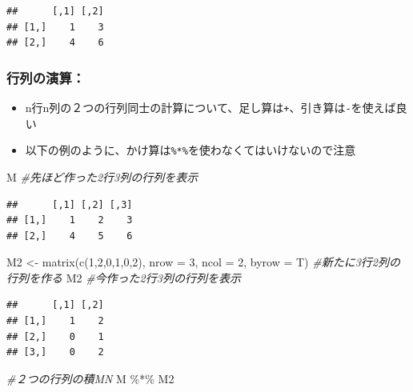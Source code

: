 \documentclass[
]{book}
\newenvironment{Shaded}{\begin{snugshade}}{\end{snugshade}}
\newcommand{\AttributeTok}[1]{\textcolor[rgb]{0.77,0.63,0.00}{#1}}
\newcommand{\CommentTok}[1]{\textcolor[rgb]{0.56,0.35,0.01}{\textit{#1}}}
\newcommand{\DecValTok}[1]{\textcolor[rgb]{0.00,0.00,0.81}{#1}}
\newcommand{\FunctionTok}[1]{\textcolor[rgb]{0.00,0.00,0.00}{#1}}
\newcommand{\NormalTok}[1]{#1}
\newcommand{\OtherTok}[1]{\textcolor[rgb]{0.56,0.35,0.01}{#1}}
\newcommand{\SpecialCharTok}[1]{\textcolor[rgb]{0.00,0.00,0.00}{#1}}
\providecommand{\tightlist}{%
  \setlength{\itemsep}{0pt}\setlength{\parskip}{0pt}}
\begin{document}
\begin{verbatim}
##      [,1] [,2]
## [1,]    1    3
## [2,]    4    6
\end{verbatim}

\hypertarget{ux884cux5217ux306eux6f14ux7b97}{%
\subsubsection*{行列の演算：}\label{ux884cux5217ux306eux6f14ux7b97}}

\begin{itemize}
\tightlist
\item
  n行n列の２つの行列同士の計算について、足し算は\texttt{+}、引き算は\texttt{-}を使えば良い
\item
  以下の例のように、かけ算は\texttt{\%*\%}を使わなくてはいけないので注意
\end{itemize}

\begin{Shaded}
\begin{Highlighting}[]
\NormalTok{M }\CommentTok{\#先ほど作った2行3列の行列を表示}
\end{Highlighting}
\end{Shaded}

\begin{verbatim}
##      [,1] [,2] [,3]
## [1,]    1    2    3
## [2,]    4    5    6
\end{verbatim}

\begin{Shaded}
\begin{Highlighting}[]
\NormalTok{M2 }\OtherTok{\textless{}{-}} \FunctionTok{matrix}\NormalTok{(}\FunctionTok{c}\NormalTok{(}\DecValTok{1}\NormalTok{,}\DecValTok{2}\NormalTok{,}\DecValTok{0}\NormalTok{,}\DecValTok{1}\NormalTok{,}\DecValTok{0}\NormalTok{,}\DecValTok{2}\NormalTok{), }\AttributeTok{nrow =} \DecValTok{3}\NormalTok{, }\AttributeTok{ncol =} \DecValTok{2}\NormalTok{, }\AttributeTok{byrow =}\NormalTok{ T) }\CommentTok{\#新たに3行2列の行列を作る}
\NormalTok{M2 }\CommentTok{\#今作った2行3列の行列を表示}
\end{Highlighting}
\end{Shaded}

\begin{verbatim}
##      [,1] [,2]
## [1,]    1    2
## [2,]    0    1
## [3,]    0    2
\end{verbatim}

\begin{Shaded}
\begin{Highlighting}[]
\CommentTok{\#２つの行列の積MN}
\NormalTok{M }\SpecialCharTok{\%*\%}\NormalTok{ M2 }
\end{Highlighting}
\end{Shaded}
\end{document}
